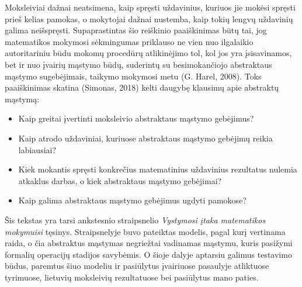 \documentclass{article}
\begin{document}
Moksleiviai dažnai neatsimena, kaip spręsti uždavinius, kuriuos jie mokėsi spręsti prieš kelias pamokas, o mokytojai dažnai nustemba, kaip tokių lengvų uždavinių galima neišspręsti. Supaprastintas šio reiškinio paaiškinimas būtų tai, jog matematikos mokymosi sėkmingumas priklauso ne vien nuo ilgalaikio autoritariniu būdu mokomų procedūrų atlikinėjimo tol, kol jos yra įsisavinamos, bet ir nuo įvairių mąstymo būdų, suderintų su besimokančiojo abstraktaus mąstymo sugebėjimais, taikymo mokymosi metu (G. Harel, 2008). Toks paaiškinimas skatina (Simonas, 2018) kelti daugybę klausimų apie abstraktų mąstymą: 
\begin{itemize}
\item Kaip greitai įvertinti moksleivio abstraktaus mąstymo gebėjimus?
\item Kaip atrodo uždaviniai, kuriuose abstraktaus mąstymo gebėjimų reikia labiausiai?
\item Kiek mokantis spręsti konkrečius matematinius uždavinius rezultatus nulemia atkaklus darbas, o kiek abstraktaus mąstymo gebėjimai?
\item Kaip galima abstraktaus mąstymo gebėjimus ugdyti pamokose?
\end{itemize}

Šis tekstas yra tarsi ankstesnio straipsnelio \textit{Vystymosi įtaka matematikos mokymuisi} tęsinys. Straipsnelyje buvo pateiktas modelis, pagal kurį vertinama raida, o čia abstraktus mąstymas negriežtai vadinamas mąstymu, kuris pasižymi formalių operacijų stadijos savybėmis. O šioje dalyje aptarsiu galimus testavimo būdus, paremtus šiuo modeliu ir pasiūlytus įvairiuose pasaulyje atliktuose tyrimuose, lietuvių moksleivių rezultatuose bei pasiūlytus mano paties. 
\end{document}
